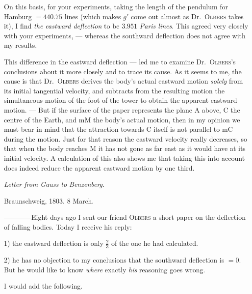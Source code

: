 On this basis, for your experiments, taking the length of the pendulum for Hamburg $=440.75$ lines (which makes $g'$ come out almost as Dr.\ \textsc{Olbers} takes it), I find \textit{the eastward deflection} to be $3.951$ \textit{Paris lines}. This agreed very closely with your experiments, — whereas the southward deflection does not agree with my results.

\begin{center}\resizebox{!}{58mm}{}\end{center}
This difference in the eastward deflection — led me to examine Dr.\ \textsc{Olbers}'s conclusions about it more closely and to trace its cause. As it seems to me, the cause is that Dr.\ \textsc{Olbers} derives the body's actual eastward motion \textit{solely} from its initial tangential velocity, and subtracts from the resulting motion the simultaneous motion of the foot of the tower to obtain the apparent eastward motion. — But if the surface of the paper represents the plane $\mathrm{A}$ above, $\mathrm{C}$ the centre of the Earth, and $\mathrm{mM}$ the body's actual motion, then in my opinion we must bear in mind that the attraction towards $\mathrm{C}$ itself is not parallel to $\mathrm{mC}$ during the motion. Just for that reason the eastward velocity really decreases, so that when the body reaches $\mathrm{M}$ it has not gone as far east as it would have at its initial velocity. A calculation of this also shows me that taking this into account does indeed reduce the apparent eastward motion by one third.

\begin{center}{\large\itshape Letter from Gauss to Benzenberg.}\end{center}
\begin{flushright}Braunschweig, 1803. 8 March.\end{flushright}
—\quad—\quad—\quad—\quad Eight days ago I sent our friend \textsc{Olbers} a short paper on the deflection of falling bodies. Today I receive his reply:

1) the eastward deflection is only $\tfrac23$ of the one he had calculated.

2) he has no objection to my conclusions that the southward deflection is $=0$. But he would like to know \textit{where} exactly \textit{his} reasoning goes wrong.

I would add the following.

